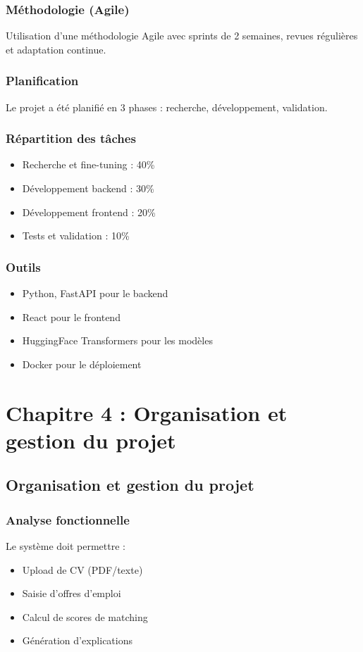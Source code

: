 \documentclass[12pt,a4paper]{report}
\begin{document}

\section{Méthodologie (Agile)}
Utilisation d'une méthodologie Agile avec sprints de 2 semaines, revues régulières et adaptation continue.

\section{Planification}
Le projet a été planifié en 3 phases : recherche, développement, validation.

\section{Répartition des tâches}
\begin{itemize}
\item Recherche et fine-tuning : 40\%
\item Développement backend : 30\%
\item Développement frontend : 20\%
\item Tests et validation : 10\%
\end{itemize}

\section{Outils}
\begin{itemize}
\item Python, FastAPI pour le backend
\item React pour le frontend
\item HuggingFace Transformers pour les modèles
\item Docker pour le déploiement
\end{itemize}

\part{Chapitre 4 : Organisation et gestion du projet}
\chapter{Organisation et gestion du projet}

\section{Analyse fonctionnelle}
Le système doit permettre :
\begin{itemize}
\item Upload de CV (PDF/texte)
\item Saisie d'offres d'emploi
\item Calcul de scores de matching
\item Génération d'explications
\end{itemize}
\end{document}

